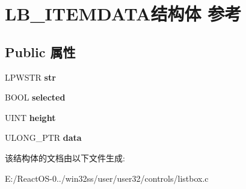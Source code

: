 \hypertarget{struct_l_b___i_t_e_m_d_a_t_a}{}\section{L\+B\+\_\+\+I\+T\+E\+M\+D\+A\+T\+A结构体 参考}
\label{struct_l_b___i_t_e_m_d_a_t_a}
\subsection*{Public 属性}
\begin{DoxyCompactItemize}
\item 
\mbox{\label{struct_l_b___i_t_e_m_d_a_t_a_a280248df66650f772173db6789a9cebc}} 
L\+P\+W\+S\+TR {\bfseries str}
\item 
\mbox{\label{struct_l_b___i_t_e_m_d_a_t_a_af7b215376c98d4d4a8bfaeb4a8b611b7}} 
B\+O\+OL {\bfseries selected}
\item 
\mbox{\label{struct_l_b___i_t_e_m_d_a_t_a_a370360fbb974a2067a8cdea3568fd4e3}} 
U\+I\+NT {\bfseries height}
\item 
\mbox{\label{struct_l_b___i_t_e_m_d_a_t_a_a086d7b79c686a05dc08aee43f1188295}} 
U\+L\+O\+N\+G\+\_\+\+P\+TR {\bfseries data}
\end{DoxyCompactItemize}


该结构体的文档由以下文件生成\+:\begin{DoxyCompactItemize}
\item 
E\+:/\+React\+O\+S-\/0../win32ss/user/user32/controls/listbox.\+c\end{DoxyCompactItemize}
